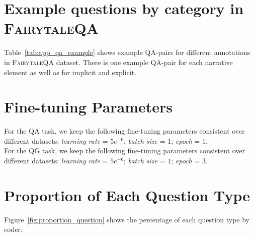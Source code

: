 \documentclass[11pt]{article}
\newcommand{\datasetname}{\textsc{FairytaleQA}\xspace}
\begin{document}
\section{Example questions by category in \datasetname}
\label{appendix:example_qs}

Table~\ref{tab:app_qa_example} shows example QA-pairs for different annotations in \datasetname dataset. There is one example QA-pair for each narrative element as well as for implicit and explicit. 




\section{Fine-tuning Parameters}
\label{appendix:parameters}
For the QA task, we keep the following fine-tuning parameters consistent over different datasets: \textit{learning rate} = $5e^{-6}$; \textit{batch size} = $1$; \textit{epoch} = $1$. \\
For the QG task, we keep the following fine-tuning parameters consistent over different datasets: \textit{learning rate} = $5e^{-6}$; \textit{batch size} = $1$; \textit{epoch} = $3$. 




\label{app:att_plot}


\section{Proportion of Each Question Type}

Figure~\ref{fig:proportion_question} shows the percentage of each question type by coder. 
\end{document}
